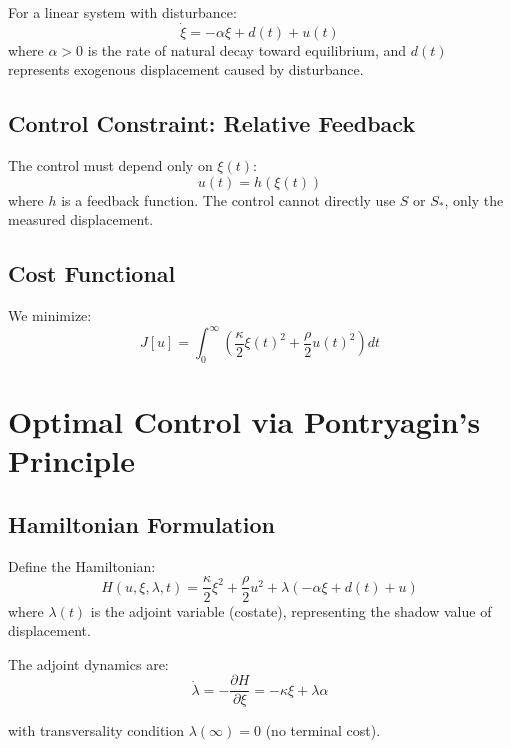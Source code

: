 \documentclass[12pt]{article}
\begin{document}
For a linear system with disturbance:
\begin{equation}
\dot{\xi} = -\alpha \xi + d(t) + u(t)
\end{equation}
where $\alpha > 0$ is the rate of natural decay toward equilibrium, and $d(t)$ represents exogenous displacement caused by disturbance.

\subsection{Control Constraint: Relative Feedback}

The control must depend only on $\xi(t)$:
\begin{equation}
u(t) = h(\xi(t))
\end{equation}
where $h$ is a feedback function. The control cannot directly use $S$ or $S_*$, only the measured displacement.

\subsection{Cost Functional}

We minimize:
\begin{equation}
J[u] = \int_0^\infty \left( \frac{\kappa}{2} \xi(t)^2 + \frac{\rho}{2} u(t)^2 \right) dt
\end{equation}

\section{Optimal Control via Pontryagin's Principle}

\subsection{Hamiltonian Formulation}

Define the Hamiltonian:
\begin{equation}
H(u, \xi, \lambda, t) = \frac{\kappa}{2} \xi^2 + \frac{\rho}{2} u^2 + \lambda (-\alpha \xi + d(t) + u)
\end{equation}
where $\lambda(t)$ is the adjoint variable (costate), representing the shadow value of displacement.

The adjoint dynamics are:
\begin{equation}
\dot{\lambda} = -\frac{\partial H}{\partial \xi} = -\kappa \xi + \lambda \alpha
\end{equation}

with transversality condition $\lambda(\infty) = 0$ (no terminal cost).
\end{document}
